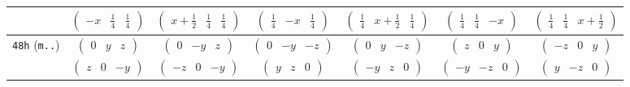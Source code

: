 \documentclass[fleqn,9pt,landscape]{jsarticle}
\begin{document}
\begin{center}
\begin{longtable}{ccccccc}
& $ \begin{pmatrix} - x & \frac{1}{4} & \frac{1}{4} \end{pmatrix} $ & $ \begin{pmatrix} x + \frac{1}{2} & \frac{1}{4} & \frac{1}{4} \end{pmatrix} $ & $ \begin{pmatrix} \frac{1}{4} & - x & \frac{1}{4} \end{pmatrix} $ & $ \begin{pmatrix} \frac{1}{4} & x + \frac{1}{2} & \frac{1}{4} \end{pmatrix} $ & $ \begin{pmatrix} \frac{1}{4} & \frac{1}{4} & - x \end{pmatrix} $ & $ \begin{pmatrix} \frac{1}{4} & \frac{1}{4} & x + \frac{1}{2} \end{pmatrix} $ \\ \hline
{\tt 48h} ({\tt m..}) & $ \begin{pmatrix} 0 & y & z \end{pmatrix} $ & $ \begin{pmatrix} 0 & - y & z \end{pmatrix} $ & $ \begin{pmatrix} 0 & - y & - z \end{pmatrix} $ & $ \begin{pmatrix} 0 & y & - z \end{pmatrix} $ & $ \begin{pmatrix} z & 0 & y \end{pmatrix} $ & $ \begin{pmatrix} - z & 0 & y \end{pmatrix} $ \\
& $ \begin{pmatrix} z & 0 & - y \end{pmatrix} $ & $ \begin{pmatrix} - z & 0 & - y \end{pmatrix} $ & $ \begin{pmatrix} y & z & 0 \end{pmatrix} $ & $ \begin{pmatrix} - y & z & 0 \end{pmatrix} $ & $ \begin{pmatrix} - y & - z & 0 \end{pmatrix} $ & $ \begin{pmatrix} y & - z & 0 \end{pmatrix} $ \\ \hline

\end{longtable}
\end{center}
\end{document}
